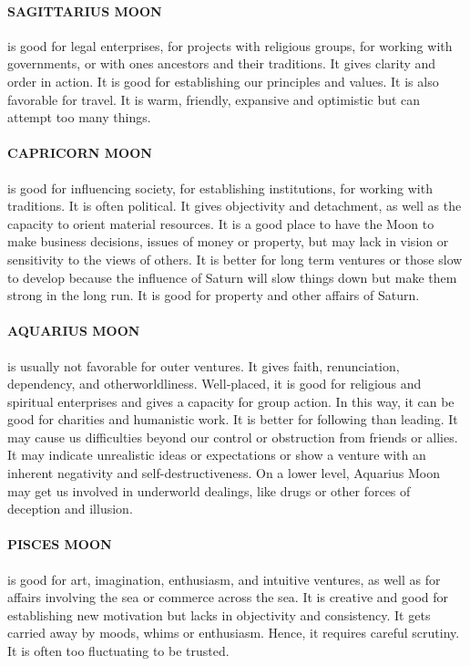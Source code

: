  

\paragraph{SAGITTARIUS MOON} is good for legal enterprises, for projects with religious groups, for working with governments, or with ones ancestors and their traditions. It gives clarity and order in action. It is good for establishing our principles and values. It is also favorable for travel. It is warm, friendly, expansive and optimistic but can attempt too many things.

 

\paragraph{CAPRICORN MOON} is good for influencing society, for establishing institutions, for working with traditions. It is often political. It gives objectivity and detachment, as well as the capacity to orient material resources. It is a good place to have the Moon to make business decisions, issues of money or property, but may lack in vision or sensitivity to the views of others. It is better for long term ventures or those slow to develop because the influence of Saturn will slow things down but make them strong in the long run. It is good for property and other affairs of Saturn.

 

\paragraph{AQUARIUS MOON} is usually not favorable for outer ventures. It gives faith, renunciation, dependency, and otherworldliness. Well‑placed, it is good for religious and spiritual enterprises and gives a capacity for group action. In this way, it can be good for charities and humanistic work. It is better for following than leading. It may cause us difficulties beyond our control or obstruction from friends or allies. It may indicate unrealistic ideas or expectations or show a venture with an inherent negativity and self-destructiveness. On a lower level, Aquarius Moon may get us involved in underworld dealings, like drugs or other forces of deception and illusion.            

 

\paragraph{PISCES MOON} is good for art, imagination, enthusiasm, and intuitive ventures, as well as for affairs involving the sea or commerce across the sea. It is creative and good for establishing new motivation but lacks in objectivity and consistency. It gets carried away by moods, whims or enthusiasm. Hence, it requires careful scrutiny. It is often too fluctuating to be trusted.


